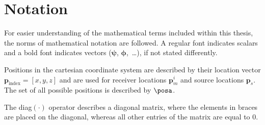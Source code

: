 \section{Notation}
\label{chap:1notation}

For easier understanding of the mathematical terms included within this thesis, the norms of mathematical notation are followed. A regular font indicates scalars and a bold font indicates vectors ($\bm\psi$, $\bm\phi$,~\dots), if not stated differently.

Positions in the cartesian coordinate system are described by their location vector $\bm p_{\text{index}}=[x, y, z]$ and are used for receiver locations $\bm p_m^i$ and source locations $\bm p_s$. The set of all possible positions is described by $\posa$. 

The diag$(\cdot)$ operator describes a diagonal matrix, where the elements in braces are placed on the diagonal, whereas all other entries of the matrix are equal to 0.
